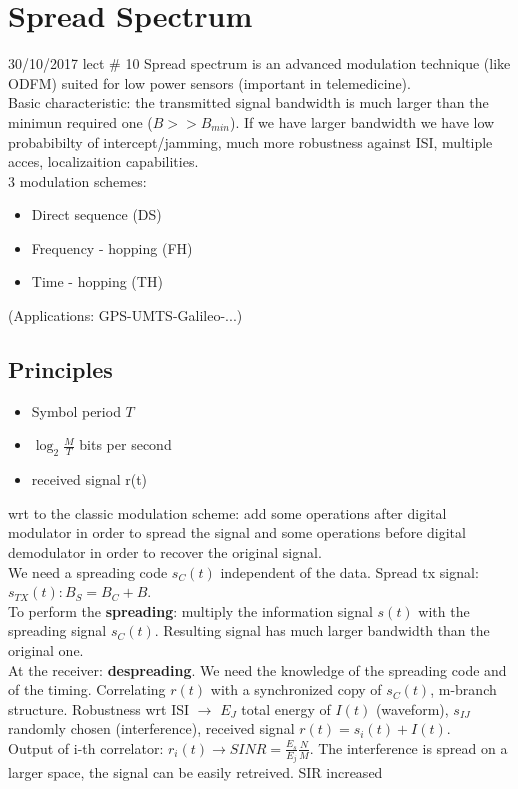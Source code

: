 \chapter{Spread Spectrum}
30/10/2017 lect \# 10
Spread spectrum is an advanced modulation technique (like ODFM) suited for low power sensors (important in telemedicine).\\
Basic characteristic: the transmitted signal bandwidth is much larger than the minimun required one ($B >> B_{min}$). If we have larger bandwidth we have low probabibilty of intercept/jamming, much more robustness against ISI, multiple acces, localizaition capabilities. \\
3 modulation schemes:
\begin{itemize}
  \item Direct sequence (DS)
  \item Frequency - hopping (FH)
  \item Time - hopping (TH)
\end{itemize}
(Applications: GPS-UMTS-Galileo-...)
\section{Principles}
\begin{itemize}
  \item Symbol period $T$
  \item $\log_2 \frac{M}{T}$ bits per second
  \item received signal r(t)
\end{itemize}
wrt to the classic modulation scheme: add some operations after digital modulator in order to spread the signal and some operations before digital demodulator in order to recover the original signal.\\
We need a spreading code $s_C(t)$ independent of the data. Spread tx signal: $s_{TX}(t): B_S = B_C + B$.\\
To perform the \textbf{spreading}: multiply the information signal $s(t)$ with the spreading signal $s_C(t)$. Resulting signal has much larger bandwidth than the original one.\\
At the receiver: \textbf{despreading}. We need the knowledge of the spreading code and of the timing. Correlating $r(t)$ with a synchronized copy of $s_C(t)$, m-branch structure.
Robustness wrt ISI $\rightarrow$ $E_J$ total energy of $I(t)$ (waveform), $s_{IJ}$ randomly chosen (interference), received signal $r(t) = s_i(t) + I(t)$.\\
Output of i-th correlator: $r_i(t)\rightarrow SINR = \frac{E_s}{E_j}\frac{N}{M}$. The interference is spread on a larger space, the signal can be easily retreived. SIR increased

